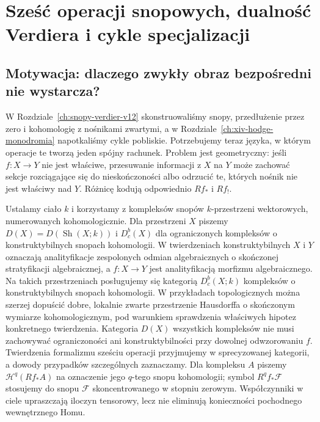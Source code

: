 \chapter{Sześć operacji snopowych, dualność Verdiera i cykle specjalizacji}
\label{ch:xvi-szesc-operacji}

\section{Motywacja: dlaczego zwykły obraz bezpośredni nie wystarcza?}
W Rozdziale~\ref{ch:snopy-verdier-v12} skonstruowaliśmy snopy,
przedłużenie przez zero i kohomologię z nośnikami zwartymi, a w
Rozdziale~\ref{ch:xiv-hodge-monodromia} napotkaliśmy cykle pobliskie.
Potrzebujemy teraz języka, w którym operacje te tworzą jeden spójny
rachunek. Problem jest geometryczny: jeśli $f:X\to Y$ nie jest właściwe,
przesuwanie informacji z $X$ na $Y$ może zachować sekcje rozciągające się
do nieskończoności albo odrzucić te, których nośnik nie jest właściwy
nad $Y$. Różnicę kodują odpowiednio $Rf_*$ i $Rf_!$.

Ustalamy ciało $k$ i korzystamy z kompleksów snopów $k$-przestrzeni
wektorowych, numerowanych kohomologicznie. Dla przestrzeni $X$
piszemy $D(X)=D(\operatorname{Sh}(X;k))$ i $D^b_c(X)$ dla
ograniczonych kompleksów o konstruktybilnych snopach kohomologii.
W twierdzeniach konstruktybilnych $X$ i $Y$ oznaczają
analityfikacje zespolonych odmian algebraicznych o skończonej
stratyfikacji algebraicznej, a $f:X\to Y$ jest analityfikacją
morfizmu algebraicznego. Na takich przestrzeniach posługujemy się
kategorią $D^b_c(X;k)$ kompleksów o konstruktybilnych snopach
kohomologii. W przykładach topologicznych można szerzej dopuścić
dobre, lokalnie zwarte przestrzenie Hausdorffa o skończonym wymiarze
kohomologicznym, pod warunkiem sprawdzenia właściwych hipotez
konkretnego twierdzenia. Kategoria $D(X)$ wszystkich kompleksów nie
musi zachowywać ograniczoności ani konstruktybilności przy dowolnej
odwzorowaniu $f$. Twierdzenia formalizmu sześciu operacji przyjmujemy w
sprecyzowanej kategorii, a dowody przypadków szczególnych zaznaczamy.
Dla kompleksu $A$ piszemy $\mathcal H^q(Rf_*A)$ na oznaczenie
jego $q$-tego snopu kohomologii; symbol $R^qf_*\mathcal F$
stosujemy do snopu $\mathcal F$ skoncentrowanego w stopniu zerowym. Współczynniki w ciele upraszczają
iloczyn tensorowy, lecz nie eliminują konieczności pochodnego
wewnętrznego Homu.

